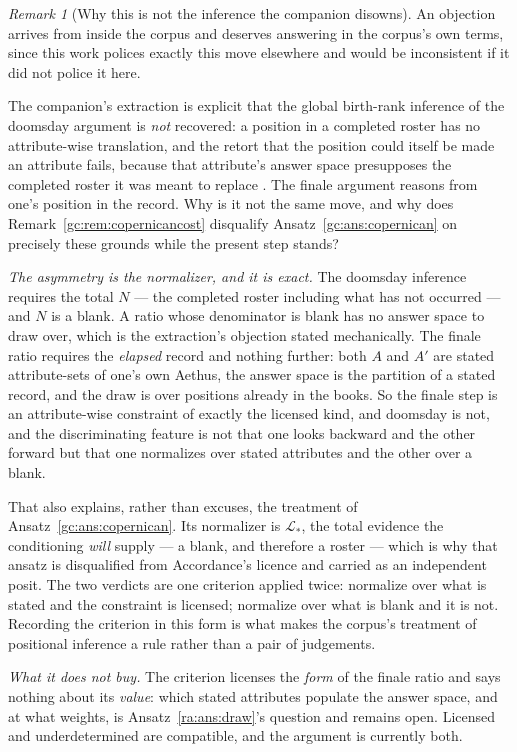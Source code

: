 \documentclass[11pt]{article}
\numberwithin{equation}{section}
\theoremstyle{plain}
\theoremstyle{definition}
\theoremstyle{remark}
\newtheorem{remark}[theorem]{Remark}
\newcommand{\Lc}{\mathcal{L}}
\begin{document}
\begin{remark}[Why this is not the inference the companion disowns]
\label{ra:rem:noroster}
An objection arrives from inside the corpus and deserves answering in
the corpus's own terms, since this work polices exactly this move
elsewhere and would be inconsistent if it did not police it here.

The companion's extraction is explicit that the global birth-rank
inference of the doomsday argument \cite{Leslie96} is \emph{not} recovered: a position
in a completed roster has no attribute-wise translation, and the retort
that the position could itself be made an attribute fails, because that
attribute's answer space presupposes the completed roster it was meant
to replace \cite{NexicFoundation}. The finale argument reasons from
one's position in the record. Why is it not the same move, and why does
Remark~\ref{gc:rem:copernicancost} disqualify
Ansatz~\ref{gc:ans:copernican} on precisely these grounds while the
present step stands?

\emph{The asymmetry is the normalizer, and it is exact.} The doomsday
inference requires the total $N$ --- the completed roster including
what has not occurred --- and $N$ is a blank. A ratio whose denominator
is blank has no answer space to draw over, which is the extraction's
objection stated mechanically. The finale ratio requires the
\emph{elapsed} record and nothing further: both $A$ and $A'$ are
stated attribute-sets of one's own Aethus, the answer space is the
partition of a stated record, and the draw is over positions already
in the books. So the finale step is an attribute-wise constraint of
exactly the licensed kind, and doomsday is not, and the discriminating
feature is not that one looks backward and the other forward but that
one normalizes over stated attributes and the other over a blank.

That also explains, rather than excuses, the treatment of
Ansatz~\ref{gc:ans:copernican}. Its normalizer is $\Lc_\ast$, the total
evidence the conditioning \emph{will} supply --- a blank, and therefore
a roster --- which is why that ansatz is disqualified from Accordance's
licence and carried as an independent posit. The two verdicts are one
criterion applied twice: normalize over what is stated and the
constraint is licensed; normalize over what is blank and it is not.
Recording the criterion in this form is what makes the corpus's
treatment of positional inference a rule rather than a pair of
judgements.

\emph{What it does not buy.} The criterion licenses the \emph{form} of
the finale ratio and says nothing about its \emph{value}: which stated
attributes populate the answer space, and at what weights, is
Ansatz~\ref{ra:ans:draw}'s question and remains open. Licensed and
underdetermined are compatible, and the argument is currently both.
\end{remark}
\end{document}
